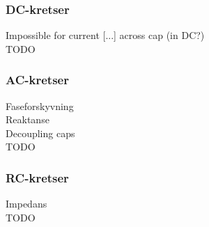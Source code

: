 \subsubsection{DC-kretser}
Impossible for current [...] across cap (in DC?) \\
TODO

\subsubsection{AC-kretser}
Faseforskyvning \\
Reaktanse \\
Decoupling caps \\
TODO

\subsubsection{RC-kretser}
Impedans \\
TODO
